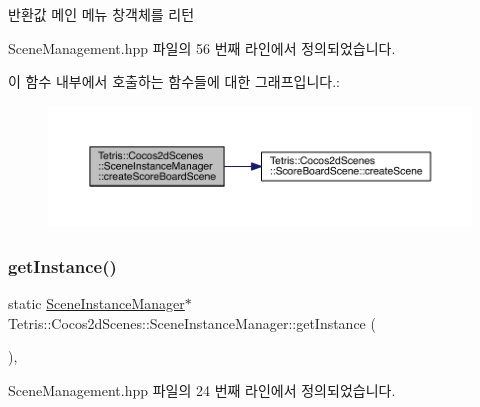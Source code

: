 \begin{DoxyReturn}{반환값}
메인 메뉴 창객체를 리턴 
\end{DoxyReturn}


Scene\+Management.\+hpp 파일의 56 번째 라인에서 정의되었습니다.

이 함수 내부에서 호출하는 함수들에 대한 그래프입니다.\+:
\nopagebreak
\begin{figure}[H]
\begin{center}
\leavevmode
\includegraphics[width=350pt]{class_tetris_1_1_cocos2d_scenes_1_1_scene_instance_manager_a159ac191291a7cc3575d6f5790df6646_cgraph}
\end{center}
\end{figure}
\mbox{\label{class_tetris_1_1_cocos2d_scenes_1_1_scene_instance_manager_a0010e1efc6470cde661494631dc35b90}} 
\subsubsection{\texorpdfstring{get\+Instance()}{getInstance()}}
{\footnotesize\ttfamily static \hyperlink{class_tetris_1_1_cocos2d_scenes_1_1_scene_instance_manager}{Scene\+Instance\+Manager}$\ast$ Tetris\+::\+Cocos2d\+Scenes\+::\+Scene\+Instance\+Manager\+::get\+Instance (\begin{DoxyParamCaption}{ }\end{DoxyParamCaption})\hspace{0.3cm}{\ttfamily [inline]}, {\ttfamily [static]}}



Scene\+Management.\+hpp 파일의 24 번째 라인에서 정의되었습니다.

